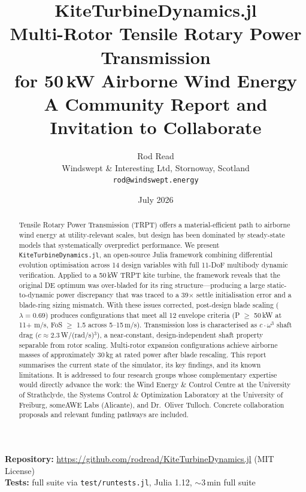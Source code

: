 \documentclass[11pt,a4paper]{article}
\title{\textbf{KiteTurbineDynamics.jl}\\[4pt]
\large Multi-Rotor Tensile Rotary Power Transmission\\for 50\,kW Airborne Wind Energy\\[8pt]
\Large A Community Report and Invitation to Collaborate}
\author{Rod Read\\[4pt]
Windswept \& Interesting Ltd, Stornoway, Scotland\\
\texttt{rod@windswept.energy}}
\date{July 2026}
\begin{document}
\maketitle
\thispagestyle{empty}

\begin{abstract}
\noindent
Tensile Rotary Power Transmission (TRPT) offers a material-efficient path to airborne wind energy at utility-relevant scales, but design has been dominated by steady-state models that systematically overpredict performance.
We present \texttt{KiteTurbineDynamics.jl}, an open-source Julia framework combining differential evolution optimisation across 14 design variables with full 11-DoF multibody dynamic verification.
Applied to a 50\,kW TRPT kite turbine, the framework reveals that the original DE optimum was over-bladed for its ring structure---producing a large static-to-dynamic power discrepancy that was traced to a 39$\times$ settle initialisation error and a blade-ring sizing mismatch.
With these issues corrected, post-design blade scaling ($\lambda = 0.69$) produces configurations that meet all 12 envelope criteria (P $\geq$ 50\,kW at 11+ m/s, FoS $\geq$ 1.5 across 5--15\,m/s).
Transmission loss is characterised as $c \cdot \omega^3$ shaft drag ($c \approx 2.3$\,W/(rad/s)$^3$), a near-constant, design-independent shaft property separable from rotor scaling.
Multi-rotor expansion configurations achieve airborne masses of approximately 30\,kg at rated power after blade rescaling.
This report summarises the current state of the simulator, its key findings, and its known limitations.
It is addressed to four research groups whose complementary expertise would directly advance the work: the Wind Energy \& Control Centre at the University of Strathclyde, the Systems Control \& Optimization Laboratory at the University of Freiburg, someAWE Labs (Alicante), and Dr.\ Oliver Tulloch.
Concrete collaboration proposals and relevant funding pathways are included.
\end{abstract}

\vspace{12pt}
\begin{center}
\small
\textbf{Repository:} \url{https://github.com/rodread/KiteTurbineDynamics.jl} (MIT License)\\
\textbf{Tests:} full suite via \texttt{test/runtests.jl}, Julia 1.12, $\sim$3\,min full suite
\end{center}

\newpage
\tableofcontents
\newpage

\end{document}
